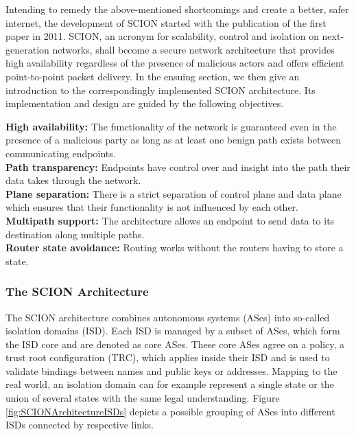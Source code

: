 Intending to remedy the above-mentioned shortcomings and create a better, safer internet, the development of SCION started with the publication of the first paper \cite{SCIONPaper} in 2011. SCION, an acronym for scalability, control and isolation on next-generation networks, shall become a secure network architecture that provides high availability regardless of the presence of malicious actors and offers efficient point-to-point packet delivery. In the ensuing section, we then give an introduction to the correspondingly implemented SCION architecture. Its implementation and design are guided by the following objectives.

{\small \textbf{High availability:} The functionality of the network is guaranteed even in the presence of a malicious party as long as at least one benign path exists between communicating endpoints. \smallskip\\
	\textbf{Path transparency:} Endpoints have control over and insight into the path their data takes through the network. \smallskip\\
	\textbf{Plane separation:} There is a strict separation of control plane and data plane which ensures that their functionality is not influenced by each other. \smallskip\\
	\textbf{Multipath support:} The architecture allows an endpoint to send data to its destination along multiple paths. \smallskip\\
	\textbf{Router state avoidance:} Routing works without the routers having to store a state.
}

\subsubsection{The SCION Architecture}

The SCION architecture combines autonomous systems (ASes) into so-called isolation domains (ISD). Each ISD is managed by a subset of ASes, which form the ISD core and are denoted as core ASes. These core ASes agree on a policy, a trust root configuration (TRC), which applies inside their ISD and is used to validate bindings between names and public keys or addresses. Mapping to the real world, an isolation domain can for example represent a single state or the union of several states with the same legal understanding. Figure \ref{fig:SCIONArchitectureISDs} depicts a possible grouping of ASes into different ISDs connected by respective links.

